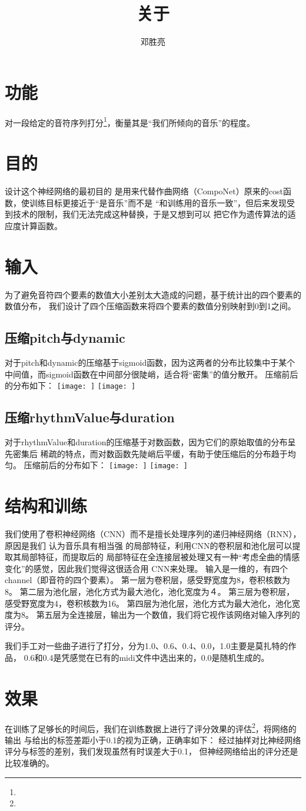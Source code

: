 \documentclass[UTF8]{article}
\title{关于}
\author{邓胜亮}
\begin{document}
  \section{功能}
    对一段给定的音符序列打分\footnote{}，衡量其是“我们所倾向的音乐”的程度。
  \section{目的}
    设计这个神经网络的最初目的
    是用来代替作曲网络（CompoNet）原来的cost函数，使训练目标更接近于“是音乐”而不是
    “和训练用的音乐一致”，但后来发现受到技术的限制，我们无法完成这种替换，于是又想到可以
    把它作为遗传算法的适应度计算函数。
  \section{输入}
    为了避免音符四个要素的数值大小差别太大造成的问题，基于统计出的四个要素的数值分布，
    我们设计了四个压缩函数来将四个要素的数值分别映射到0到1之间。
    \subsection{压缩pitch与dynamic}
      对于pitch和dynamic的压缩基于sigmoid函数，因为这两者的分布比较集中于某个
      中间值，而sigmoid函数在中间部分很陡峭，适合将“密集”的值分散开。
      压缩前后的分布如下：
      \texttt{[image: ]}
      \texttt{[image: ]}
    \subsection{压缩rhythmValue与duration}
      对于rhythmValue和duration的压缩基于对数函数，因为它们的原始取值的分布呈先密集后
      稀疏的特点，而对数函数先陡峭后平缓，有助于使压缩后的分布趋于均匀。
      压缩前后的分布如下：
      \texttt{[image: ]}
      \texttt{[image: ]}

  \section{结构和训练}
    我们使用了卷积神经网络（CNN）而不是擅长处理序列的递归神经网络（RNN），原因是我们
    认为音乐具有相当强
    的局部特征，利用CNN的卷积层和池化层可以提取其局部特征\cite{}，而提取后的
    局部特征在全连接层被处理又有一种“考虑全曲的情感变化”的感觉，因此我们觉得这很适合用
    CNN来处理。
    输入是一维的，有四个channel（即音符的四个要素）。
    第一层为卷积层，感受野宽度为8，卷积核数为8。
    第二层为池化层，池化方式为最大池化，池化宽度为４。
    第三层为卷积层，感受野宽度为4，卷积核数为16。
    第四层为池化层，池化方式为最大池化，池化宽度为8。
    第五层为全连接层，输出为一个数值，我们将它视作该网络对输入序列的评分。

    我们手工对一些曲子进行了打分，分为1.0、0.6、0.4、0.0，1.0主要是莫扎特的作品，
    0.6和0.4是凭感觉在已有的midi文件中选出来的，0.0是随机生成的。
  \section{效果}
    在训练了足够长的时间后，我们在训练数据上进行了评分效果的评估\footnote{}，将网络的输出
    与给出的标签差距小于0.1的视为正确，正确率如下：
    经过抽样对比神经网络评分与标签的差别，我们发现虽然有时误差大于0.1，
    但神经网络给出的评分还是比较准确的。 %
\end{document}

